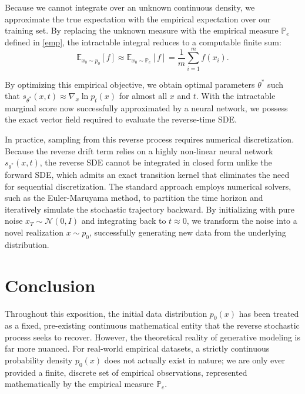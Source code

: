 \documentclass[11pt]{amsart}
\theoremstyle{plain}
\theoremstyle{definition}
\theoremstyle{remark}
\numberwithin{equation}{section}
\begin{document}
{Because we cannot integrate over an unknown continuous density, we approximate the true expectation with the empirical expectation over our training set. By replacing the unknown measure with the empirical measure $\mathbb{P}_e$ defined in \eqref{emp}, the intractable integral reduces to a computable finite sum:
$$ \mathbb{E}_{x_0 \sim p_0}[f] \approx \mathbb{E}_{x_0 \sim \mathbb{P}_e}[f] = \frac{1}{m} \sum_{i=1}^m f(x_i). $$

By optimizing this empirical objective, we obtain optimal parameters $\theta^*$ such that $s_{\theta^*}(x, t) \approx \nabla_x \ln p_t(x)$ for almost all $x$ and $t$. With the intractable marginal score now successfully approximated by a neural network, we possess the exact vector field required to evaluate the reverse-time SDE.

In practice, sampling from this reverse process requires numerical discretization. Because the reverse drift term relies on a highly non-linear neural network $s_{\theta^*}(x, t)$, the reverse SDE cannot be integrated in closed form unlike the forward SDE, which admits an exact transition kernel that eliminates the need for sequential discretization. The standard approach employs numerical solvers, such as the Euler-Maruyama method, to partition the time horizon and iteratively simulate the stochastic trajectory backward. By initializing with pure noise $x_T \sim \mathcal{N}(0, I)$ and integrating back to $t \approx 0$, we transform the noise into a novel realization $x \sim p_0$, successfully generating new data from the underlying distribution.


\section{Conclusion}

Throughout this exposition, the initial data distribution $p_0(x)$ has been treated as a fixed, pre-existing continuous mathematical entity that the reverse stochastic process seeks to recover. However, the theoretical reality of generative modeling is far more nuanced. For real-world empirical datasets, a strictly continuous probability density $p_0(x)$ does not actually exist in nature; we are only ever provided a finite, discrete set of empirical observations, represented mathematically by the empirical measure $\mathbb{P}_e$.\\

}
\end{document}
